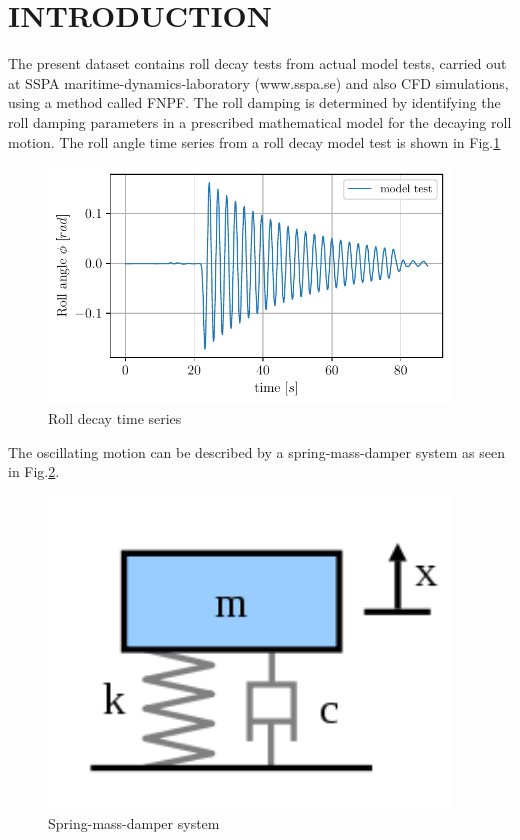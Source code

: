 \section*{INTRODUCTION}\label{introduction}
The present dataset contains roll decay tests from actual model tests,
carried out at SSPA maritime-dynamics-laboratory (www.sspa.se) and also
CFD simulations, using a method called FNPF. The roll damping is
determined by identifying the roll damping parameters in a prescribed
mathematical model for the decaying roll motion. The roll angle time
series from a roll decay model test is shown in
Fig.\ref{fig:rolldecay_example}
\begin{figure}[H]
\begin{center}\includegraphics[width = 0.95\textwidth]{figures/rolldecay_example.pdf}\end{center}
\vspace{-0.7cm}
\caption{Roll decay time series}
\label{fig:rolldecay_example}
\end{figure}
The oscillating motion can be described by a spring-mass-damper system
as seen in Fig.\ref{fig:spring_mass_damper}.
\begin{figure}[H]
\begin{center}\includegraphics[width = 0.95\textwidth]{figures/spring_mass_damper.png}\end{center}
\vspace{-0.7cm}
\caption{Spring-mass-damper system}
\label{fig:spring_mass_damper}
\end{figure}
